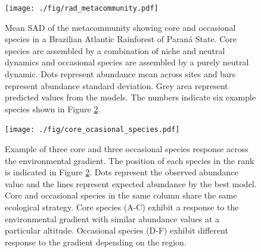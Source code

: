 \documentclass[12pt]{article}
\begin{document}
\begin{figure}[!h]
 \begin{center}
\texttt{[image: ./fig/rad\_metacommunity.pdf]}
\end{center}
\caption{Mean SAD of the metacommunity showing core and occasional species in a Brazilian Atlantic Rainforest of Paran\'a State.
  Core species are assembled by a combination of niche and neutral dynamics and occasional species are assembled by a purely neutral dynamic. %
  Dots represent abundance mean across sites and bars represent abundance standard deviation. Grey area represent predicted values from the models. The numbers indicate six example species shown in Figure \ref{fig:spp}.}\label{fig:rad} %
\end{figure}


\begin{figure}[!h]
 \begin{center}
\texttt{[image: ./fig/core\_ocasional\_species.pdf]}
\end{center}
\caption{Example of three core and three occasional species response across the environmental gradient. The position of each species in the rank is indicated in Figure \ref{fig:spp}. Dots represent the observed abundance value and the lines represent expected abundance by the best model. Core and occasional species in the same column share the same ecological strategy. Core species (A-C) exhibit a response to the environmental gradient with similar abundance values at a particular altitude. Occasional species (D-F) exhibit different response to the gradient depending on the region.} \label{fig:spp}
\end{figure}
\end{document}
